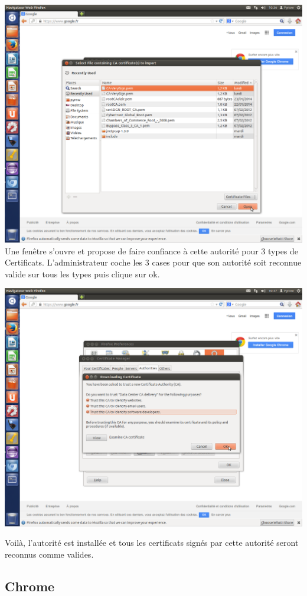 \documentclass[a4paper,11pt,french]{article}
\begin{document}
\includegraphics[width=\textwidth]{images/OngletImport.png}
\newpage
Une fenêtre s'ouvre et propose de faire confiance à cette autorité pour 3 types de Certificats. L'administrateur coche les 3 cases pour que son autorité soit reconnue valide sur tous les types puis clique sur ok.

\includegraphics[width=\textwidth]{images/OngletConfirm.png} 


Voilà, l'autorité est installée et tous les certificats signés par cette autorité seront reconnus comme valides.
\newpage
\subsection{Chrome}
\end{document}
